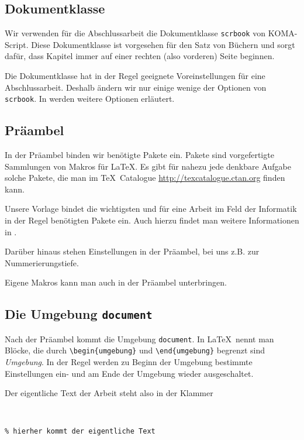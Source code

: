\subsection{Dokumentklasse}

Wir verwenden für die Abschlussarbeit die Dokumentklasse \verb=scrbook=
von \textsf{KOMA-Script}. Diese Dokumentklasse ist vorgesehen für den
Satz von Büchern und sorgt dafür, dass Kapitel immer auf einer rechten
(also vorderen) Seite beginnen.

Die Dokumentklasse hat in der Regel geeignete Voreinstellungen für eine
Abschlussarbeit. Deshalb ändern wir nur einige wenige der Optionen von
\verb=scrbook=. In \cite{partosch15} werden weitere Optionen erläutert.

\subsection{Präambel}

In der Präambel binden wir benötigte Pakete ein.  Pakete sind
vorgefertigte Sammlungen von Makros für \LaTeX. Es  gibt für nahezu jede
denkbare Aufgabe solche Pakete, die man im \TeX\ Catalogue
\url{http://texcatalogue.ctan.org} finden kann.

Unsere Vorlage bindet die wichtigsten und für eine Arbeit im Feld der
Informatik in der Regel benötigten Pakete ein. Auch hierzu findet man
weitere Informationen in \cite{partosch15}.

Darüber hinaus stehen Einstellungen in der Präambel, bei uns z.B. zur
Nummerierungstiefe.

Eigene Makros kann man auch in der Präambel unterbringen.

\subsection{Die Umgebung \texttt{document}}

Nach der Präambel kommt die Umgebung \verb=document=. In \LaTeX\ nennt
man Blöcke, die durch \verb=\begin{umgebung}= und \verb=\end{umgebung}=
begrenzt sind \emph{Umgebung}. In der Regel werden zu Beginn der
Umgebung bestimmte Einstellungen ein- und am Ende der Umgebung wieder
ausgeschaltet.

Der eigentliche Text der Arbeit steht also in der Klammer

\begin{lstlisting}


% hierher kommt der eigentliche Text


\end{lstlisting}


